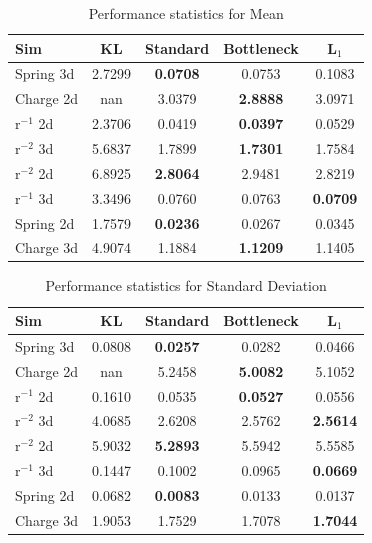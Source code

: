 \documentclass[11pt]{article}
\begin{document}
    \begin{table}[h]
        \centering
        \begin{tabular}{lcccc}
        \hline
        Sim & KL & Standard & Bottleneck & L$_{1}$ \\
        \hline
        Spring 3d & 2.7299 & \textbf{0.0708} & 0.0753 & 0.1083 \\
        Charge 2d & nan & 3.0379 & \textbf{2.8888} & 3.0971 \\
        r$^{-1}$ 2d & 2.3706 & 0.0419 & \textbf{0.0397} & 0.0529 \\
        r$^{-2}$ 3d & 5.6837 & 1.7899 & \textbf{1.7301} & 1.7584 \\
        r$^{-2}$ 2d & 6.8925 & \textbf{2.8064} & 2.9481 & 2.8219 \\
        r$^{-1}$ 3d & 3.3496 & 0.0760 & 0.0763 & \textbf{0.0709} \\
        Spring 2d & 1.7579 & \textbf{0.0236} & 0.0267 & 0.0345 \\
        Charge 3d & 4.9074 & 1.1884 & \textbf{1.1209} & 1.1405 \\
        \hline
        \end{tabular}
        \caption{Performance statistics for Mean}
        \label{tab:Mean}
        \end{table}
        \begin{table}[h]
            \centering
            \begin{tabular}{lcccc}
            \hline
            Sim & KL & Standard & Bottleneck & L$_{1}$ \\
            \hline
            Spring 3d & 0.0808 & \textbf{0.0257} & 0.0282 & 0.0466 \\
            Charge 2d & nan & 5.2458 & \textbf{5.0082} & 5.1052 \\
            r$^{-1}$ 2d & 0.1610 & 0.0535 & \textbf{0.0527} & 0.0556 \\
            r$^{-2}$ 3d & 4.0685 & 2.6208 & 2.5762 & \textbf{2.5614} \\
            r$^{-2}$ 2d & 5.9032 & \textbf{5.2893} & 5.5942 & 5.5585 \\
            r$^{-1}$ 3d & 0.1447 & 0.1002 & 0.0965 & \textbf{0.0669} \\
            Spring 2d & 0.0682 & \textbf{0.0083} & 0.0133 & 0.0137 \\
            Charge 3d & 1.9053 & 1.7529 & 1.7078 & \textbf{1.7044} \\
            \hline
            \end{tabular}
            \caption{Performance statistics for Standard Deviation}
            \label{tab:Standard Deviation}
            \end{table}
            
\end{document}

